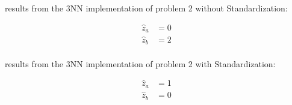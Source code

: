 results from the 3NN implementation of problem 2 without Standardization:

\begin{align*}
\hat z_a &= 0 \\
\hat z_b &= 2
\end{align*}
\\
results from the 3NN implementation of problem 2 with Standardization:

\begin{align*}
	\hat z_a &= 1 \\
	\hat z_b &= 0
\end{align*}